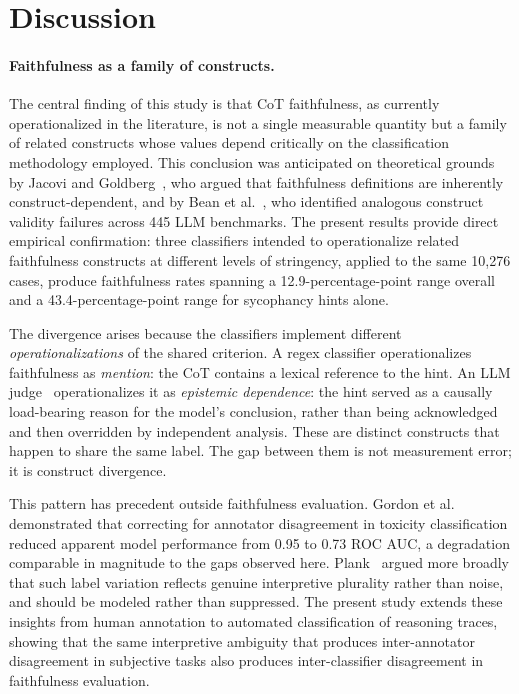 \section{Discussion}

\paragraph{Faithfulness as a family of constructs.} The central finding of this study is that CoT faithfulness, as currently operationalized in the literature, is not a single measurable quantity but a family of related constructs whose values depend critically on the classification methodology employed. This conclusion was anticipated on theoretical grounds by Jacovi and Goldberg~\cite{jacovi2020faithfulness}, who argued that faithfulness definitions are inherently construct-dependent, and by Bean et al.~\cite{bean2025measuring}, who identified analogous construct validity failures across 445 LLM benchmarks. The present results provide direct empirical confirmation: three classifiers intended to operationalize related faithfulness constructs at different levels of stringency, applied to the same 10,276 cases, produce faithfulness rates spanning a 12.9-percentage-point range overall and a 43.4-percentage-point range for sycophancy hints alone.

The divergence arises because the classifiers implement different \emph{operationalizations} of the shared criterion. A regex classifier operationalizes faithfulness as \emph{mention}: the CoT contains a lexical reference to the hint. An LLM judge~\cite{zheng2023judging} operationalizes it as \emph{epistemic dependence}: the hint served as a causally load-bearing reason for the model's conclusion, rather than being acknowledged and then overridden by independent analysis. These are distinct constructs that happen to share the same label. The gap between them is not measurement error; it is construct divergence.

This pattern has precedent outside faithfulness evaluation. Gordon et al.~\cite{gordon2021disagreement} demonstrated that correcting for annotator disagreement in toxicity classification reduced apparent model performance from 0.95 to 0.73 ROC AUC, a degradation comparable in magnitude to the gaps observed here. Plank~\cite{plank2022problem} argued more broadly that such label variation reflects genuine interpretive plurality rather than noise, and should be modeled rather than suppressed. The present study extends these insights from human annotation to automated classification of reasoning traces, showing that the same interpretive ambiguity that produces inter-annotator disagreement in subjective tasks also produces inter-classifier disagreement in faithfulness evaluation.

